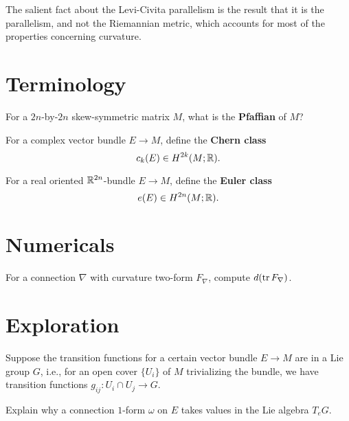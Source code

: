 \documentclass{homework}
\author{Jim Fowler}
\begin{document}
\maketitle

\begin{inspiration} The salient fact about the Levi-Civita parallelism
is the result that it is the parallelism, and not the Riemannian
metric, which accounts for most of the properties concerning
curvature.  
\end{inspiration}

\section{Terminology}

\begin{problem}
  For a $2n$-by-$2n$ skew-symmetric matrix $M$, what is the \textbf{Pfaffian} of $M$?
\end{problem}

\begin{problem}
  For a complex vector bundle $E \to M$, define the \textbf{Chern class}
  \[
    c_k(E) \in H^{2k}(M;\mathbb{R}).
  \]
\end{problem}

\begin{problem}
  For a real oriented $\mathbb{R}^{2n}$-bundle $E \to M$, define the \textbf{Euler class}
  \[
    e(E) \in H^{2n}(M;\mathbb{R}).
    \]
\end{problem}

\section{Numericals}

\begin{problem}
  For a connection $\nabla$ with curvature two-form $F_\nabla$, compute
    $d(\operatorname{tr} F_\nabla)$.
\end{problem}

\section{Exploration}

\begin{problem} Suppose the transition functions for a certain vector
bundle $E \to M$ are in a Lie group $G$, i.e., for an open cover $\{
U_i \}$ of $M$ trivializing the bundle, we have transition functions
$g_{ij} : U_i \cap U_j \to G$.

Explain why a connection $1$-form $\omega$ on $E$ takes values in the
Lie algebra $T_e G$.
\end{problem}
\end{document}
